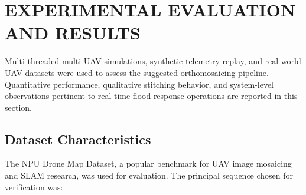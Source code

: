 \documentclass[conference]{IEEEtran}
\begin{document}




\section{EXPERIMENTAL EVALUATION AND RESULTS}
Multi-threaded multi-UAV simulations, synthetic telemetry replay, and real-world UAV datasets were used to assess the suggested orthomosaicing pipeline. Quantitative performance, qualitative stitching behavior, and system-level observations pertinent to real-time flood response operations are reported in this section.

\subsection{Dataset Characteristics}
The NPU Drone Map Dataset, a popular benchmark for UAV image mosaicing and SLAM research, was used for evaluation. The principal sequence chosen for verification was:
\end{document}
